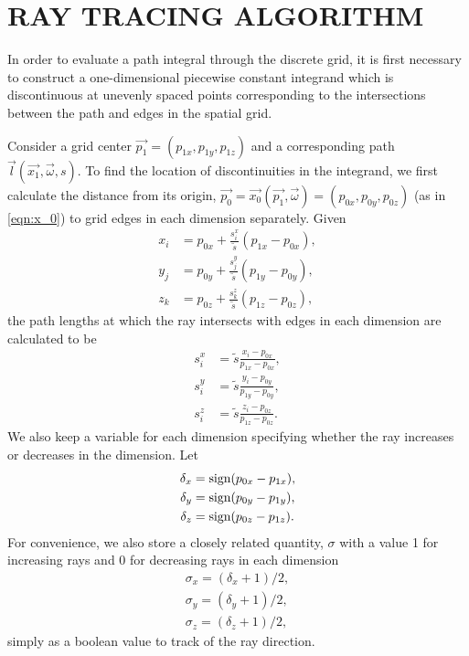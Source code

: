 \chapter{RAY TRACING ALGORITHM}
\label{chap:ray_tracing}


In order to evaluate a path integral through the discrete grid, it
is first necessary to construct a one-dimensional piecewise constant integrand
which is discontinuous at unevenly spaced points corresponding to the
intersections between the path and edges in the spatial grid.

Consider a grid center $\vec{p_1} = (p_{1x},p_{1y},p_{1z})$ and a corresponding path $\vec{l}(\vec{x_1}, \vec{\omega}, s)$.
To find the location of discontinuities in the integrand, we first calculate the
distance from its origin, $\vec{p_0} = \vec{x_0}(\vec{p_1}, \vec{\omega}) = (p_{0x}, p_{0y}, p_{0z})$ (as in \eqref{eqn:x_0}) to grid edges in each dimension
separately.
Given
\begin{align}
  x_i &= p_{0x} + \frac{s_i^x}{\tilde{s}}(p_{1x}-p_{0x}), \\
  y_j &= p_{0y} + \frac{s_j^y}{\tilde{s}}(p_{1y}-p_{0y}), \\
  z_k &= p_{0z} + \frac{s_k^z}{\tilde{s}}(p_{1z}-p_{0z}),
\end{align}
the path lengths at which the ray intersects with edges in each dimension are calculated to be
\begin{align}
  s_i^x &= \tilde{s}\frac{x_i-p_{0x}}{p_{1x}-p_{0x}}, \\
  s_i^y &= \tilde{s}\frac{y_i-p_{0y}}{p_{1y}-p_{0y}}, \\
  s_i^z &= \tilde{s}\frac{z_i-p_{0z}}{p_{1z}-p_{0z}}.
\end{align}
We also keep a variable for each dimension specifying whether the ray increases
or decreases in the dimension. Let
\begin{align}
  \delta_x &= \mbox{sign}(p_{0x}-p_{1x}), \\
  \delta_y &= \mbox{sign}(p_{0y}-p_{1y}), \\
  \delta_z &= \mbox{sign}(p_{0z}-p_{1z}).
\end{align}
For convenience, we also store a closely related quantity, $\sigma$ with a value 1 for
increasing rays and 0 for decreasing rays in each dimension
\begin{align}
  \sigma_x = (\delta_x+1)/2, \\
  \sigma_y = (\delta_y+1)/2, \\
  \sigma_z = (\delta_z+1)/2,
\end{align}
simply as a boolean value to track of the ray direction.

